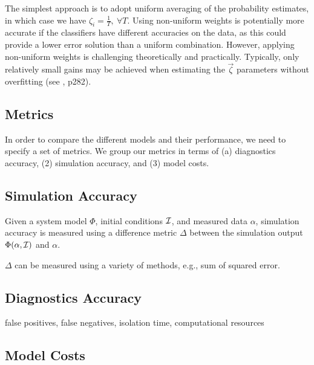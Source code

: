 The simplest approach is to adopt uniform averaging of the probability estimates, in which case we have $\zeta_i = \frac{1}{T}, ~\forall T$.
Using non-uniform weights is potentially more accurate if the classifiers have different accuracies on the data, as this could provide a lower error solution than a uniform combination.
However, applying non-uniform weights is challenging theoretically and practically.
Typically, only relatively small gains may be achieved when estimating the $\vec{\zeta}$ parameters without overfitting (see \citep{kuncheva2004combining}, p282).


\subsection{Metrics}


In order to compare the different models and their performance, we need to specify a set of metrics. We group our metrics in terms of (a) diagnostics accuracy, (2) simulation accuracy, and (3) model costs.

\subsection{Simulation Accuracy}

\begin{definition}
Given a system model $\Phi$, 
initial conditions $\cal I$, and measured data $\alpha$, simulation accuracy is measured using a difference metric $\Delta$ between the simulation output $\Phi(\alpha, {\cal I})$ and $\alpha$.
\end{definition}

$\Delta$ can be measured using a variety of methods, e.g., sum of squared error.

\subsection{Diagnostics Accuracy}


false positives, false negatives, isolation time, computational resources



\subsection{Model Costs}

